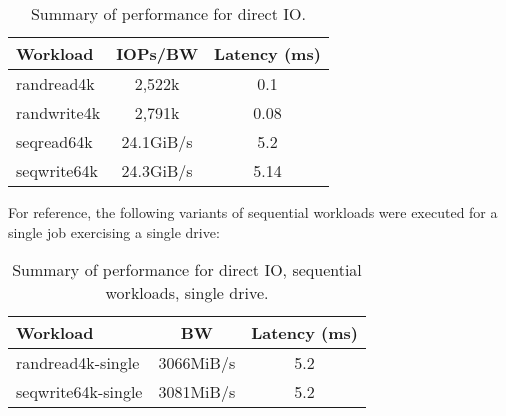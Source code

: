 \begin{table}[h!]
\centering
\begin{tabular}[t]{|l*{2}{|c|}}
   \hline
   \textbf{Workload} & \textbf{IOPs/BW} & \textbf{Latency (ms)} \\
   \hline
   randread4k & 2,522k & 0.1 \\
   randwrite4k & 2,791k & 0.08 \\
   seqread64k & 24.1GiB/s  & 5.2 \\
   seqwrite64k & 24.3GiB/s & 5.14 \\
   \hline
\end{tabular}
\caption{Summary of performance for direct IO.}
\label{table:rawio}
\end{table}

For reference, the following variants of sequential workloads were executed for a single job exercising a single drive:

\begin{table}[h!]
\centering
\begin{tabular}[t]{|l*{2}{|c|}}
   \hline
   \textbf{Workload} & \textbf{BW} & \textbf{Latency (ms)} \\
   \hline
   randread4k-single & 3066MiB/s & 5.2 \\
   seqwrite64k-single & 3081MiB/s & 5.2 \\
   \hline
\end{tabular}
\caption{Summary of performance for direct IO, sequential workloads, single drive.}
\label{table:rawio-single}
\end{table}
